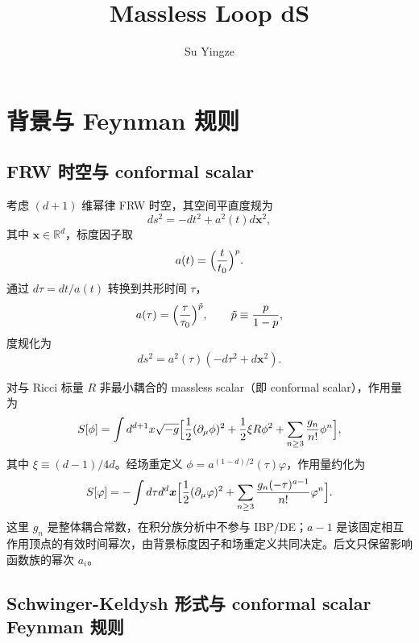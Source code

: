 ﻿\documentclass[a4paper,11pt]{article}
\title{Massless Loop dS}
\author[a]{Su Yingze}
\affiliation[a]{Institute not specified}
\begin{document}
\maketitle
\tableofcontents
\newpage

\section{背景与 Feynman 规则}

\subsection{FRW 时空与 conformal scalar}

考虑 $(d+1)$ 维幂律 FRW 时空，其空间平直度规为
\begin{equation}
    ds^2=-dt^2+a^2(t)d\boldsymbol{x}^2,
\end{equation}
其中 $\boldsymbol{x}\in\mathbb{R}^d$，标度因子取
\begin{equation}
    a(t)=\Bigl(\frac{t}{t_0}\Bigr)^p.
\end{equation}
通过 $d\tau=dt/a(t)$ 转换到共形时间 $\tau$，
\begin{equation}
    a(\tau)=\Bigl(\frac{\tau}{\tau_0}\Bigr)^{\tilde{p}},\qquad \tilde{p}\equiv\frac{p}{1-p},
\end{equation}
度规化为
\begin{equation}
    ds^2=a^2(\tau)(-d\tau^2+d\boldsymbol{x}^2).
\end{equation}

对与 Ricci 标量 $R$ 非最小耦合的 massless scalar（即 conformal scalar），作用量为
\begin{equation}
    S[\phi]=\int d^{d+1}x\sqrt{-g}\Bigl[\frac12(\partial_\mu\phi)^2+\frac12\xi R\phi^2+\sum_{n\ge3}\frac{g_n}{n!}\phi^n\Bigr],
\end{equation}
其中 $\xi\equiv(d-1)/4d$。经场重定义 $\phi=a^{(1-d)/2}(\tau)\varphi$，作用量约化为
\begin{equation}
    S[\varphi]=-\int d\tau d^d\boldsymbol{x}\Bigl[\frac12(\partial_\mu\varphi)^2+\sum_{n\ge3}\frac{g_n(-\tau)^{a-1}}{n!}\varphi^n\Bigr].
\end{equation}
这里 $g_n$ 是整体耦合常数，在积分族分析中不参与 IBP/DE；$a-1$ 是该固定相互作用顶点的有效时间幂次，由背景标度因子和场重定义共同决定。后文只保留影响函数族的幂次 $a_i$。

\subsection{Schwinger-Keldysh 形式与 conformal scalar Feynman 规则}
\end{document}

